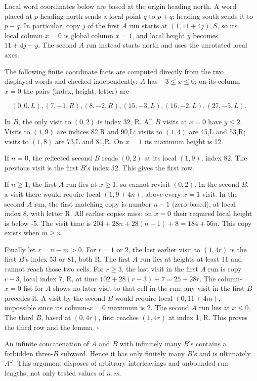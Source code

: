 \documentclass[
  11pt,
]{article}
\begin{document}
Local word coordinates below are based at the origin heading north. A word
placed at $p$ heading north sends a local point $q$ to $p+q$; heading south
sends it to $p-q$. In particular, copy $j$ of the first $A$ run starts at
$(1,11+4j),S$, so its local column $x=0$ is global column $x=1$, and local
height $y$ becomes $11+4j-y$. The second $A$ run instead starts north and
uses the unrotated local axes.

The following finite coordinate facts are computed directly from the two
displayed words and checked independently: \(A\) has \(-3\le x\le0\); on
its column \(x=0\) the pairs (index, height, letter) are

\[ (0,0,L),(7,-1,R),(8,-2,R),(15,-3,L),(16,-2,L),(27,-5,L).\]

In \(B\), the only visit to \((0,2)\) is index 32, R. All \(B\) visits
at \(x=0\) have \(y\le2\). Visits to \((1,9)\) are indices 82,R and
90,L; visits to \((1,4)\) are 45,L and 53,R; visits to \((1,8)\) are
73,L and 81,R. On \(x=1\) its maximum height is 12.

If \(n=0\), the reflected second \(B\) reads \((0,2)\) at its local
\((1,9)\), index 82. The previous visit is the first \(B\)'s index 32.
This gives the first row.

If \(n\ge1\), the first \(A\) run lies at \(x\ge1\), so cannot revisit
\((0,2)\). In the second \(B\), a visit there would require local
\((1,9+4n)\), above every \(x=1\) visit. In the second \(A\) run, the
first matching copy is number \(n-1\) (zero-based), at local index 8,
with letter R. All earlier copies miss: on \(x=0\) their required local
height is below -5. The visit time is \(204+28n+28(n-1)+8=184+56n\).
This copy exists when \(m\ge n\).

Finally let \(r=n-m>0\). For \(r=1\) or 2, the last earlier visit to
\((1,4r)\) is the first \(B\)'s index 53 or 81, both R. The first \(A\)
run lies at heights at least 11 and cannot reach those two cells. For
\(r\ge3\), the last visit in the first \(A\) run is copy \(r-3\), local
index 7, R, at time \(102+28(r-3)+7=25+28r\). The column-\(x=0\) list
for \(A\) shows no later visit to that cell in the run; any visit in the
first \(B\) precedes it. A visit by the second \(B\) would require local
\((0,11+4m)\), impossible since its column-\(x=0\) maximum is 2. The
second \(A\) run lies at \(x\le0\). The third \(B\), based at
\((0,4r)\), first reaches \((1,4r)\) at index 1, R. This proves the
third row and the lemma. \(\square\)

An infinite concatenation of \(A\) and \(B\) with infinitely many
\(B\)'s contains a forbidden three-\(B\) subword. Hence it has only
finitely many \(B\)'s and is ultimately \(A^\omega\). This argument
disposes of arbitrary interleavings and unbounded run lengths, not only
tested values of \(n,m\).
\end{document}
